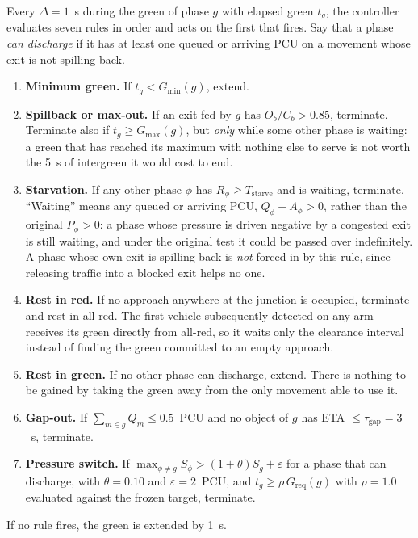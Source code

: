 Every $\Delta = 1$~s during the green of phase $g$ with elapsed green $t_g$, the controller evaluates
seven rules in order and acts on the first that fires. Say that a phase \emph{can discharge} if it has at
least one queued or arriving PCU on a movement whose exit is not spilling back.
\begin{enumerate}[noitemsep]
  \item \textbf{Minimum green.} If $t_g < G_{\min}(g)$, extend.
  \item \textbf{Spillback or max-out.} If an exit fed by $g$ has $O_b/C_b > 0.85$, terminate. Terminate also
        if $t_g \geq G_{\max}(g)$, but \emph{only} while some other phase is waiting: a green that has reached
        its maximum with nothing else to serve is not worth the 5~s of intergreen it would cost to end.
  \item \textbf{Starvation.} If any other phase $\phi$ has $R_\phi \geq T_{\text{starve}}$ and is waiting,
        terminate. ``Waiting'' means any queued or arriving PCU, $Q_\phi + A_\phi > 0$, rather than the
        original $P_\phi > 0$: a phase whose pressure is driven negative by a congested exit is still waiting,
        and under the original test it could be passed over indefinitely. A phase whose own exit is spilling
        back is \emph{not} forced in by this rule, since releasing traffic into a blocked exit helps no one.
  \item \textbf{Rest in red.} If no approach anywhere at the junction is occupied, terminate and rest in
        all-red. The first vehicle subsequently detected on any arm receives its green directly from all-red,
        so it waits only the clearance interval instead of finding the green committed to an empty approach.
  \item \textbf{Rest in green.} If no other phase can discharge, extend. There is nothing to be gained by
        taking the green away from the only movement able to use it.
  \item \textbf{Gap-out.} If $\sum_{m\in g} Q_m \leq 0.5$~PCU and no object of $g$ has ETA
        $\leq \tau_{\text{gap}} = 3$~s, terminate.
  \item \textbf{Pressure switch.} If $\max_{\phi \neq g} S_\phi > (1+\theta) S_g + \varepsilon$ for a phase
        that can discharge, with $\theta = 0.10$ and $\varepsilon = 2$~PCU, and $t_g \geq \rho\,
        G_{\text{req}}(g)$ with $\rho = 1.0$ evaluated against the frozen target, terminate.
\end{enumerate}
If no rule fires, the green is extended by 1~s.

